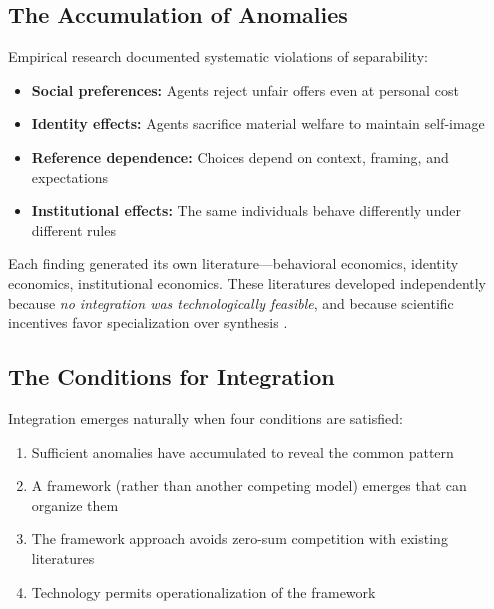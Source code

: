 \documentclass[12pt,a4paper]{article}
\theoremstyle{definition}
\begin{document}
\subsection{The Accumulation of Anomalies}

Empirical research documented systematic violations of separability:

\begin{itemize}[leftmargin=*]
    \item \textbf{Social preferences:} Agents reject unfair offers even at personal cost \citep{guth1982,fehrschmidt1999}

    \item \textbf{Identity effects:} Agents sacrifice material welfare to maintain self-image \citep{akerlofkranton2000,benaboutirole2006}

    \item \textbf{Reference dependence:} Choices depend on context, framing, and expectations \citep{kahnemantversky1979}

    \item \textbf{Institutional effects:} The same individuals behave differently under different rules \citep{north1990,acemoglurobinson2012}
\end{itemize}

Each finding generated its own literature---behavioral economics, identity economics, institutional economics. These literatures developed independently because \emph{no integration was technologically feasible}, and because scientific incentives favor specialization over synthesis \citep{smaldino2016}.


\subsection{The Conditions for Integration}

Integration emerges naturally when four conditions are satisfied:

\begin{enumerate}
    \item Sufficient anomalies have accumulated to reveal the common pattern
    \item A framework (rather than another competing model) emerges that can organize them
    \item The framework approach avoids zero-sum competition with existing literatures
    \item Technology permits operationalization of the framework
\end{enumerate}
\end{document}
